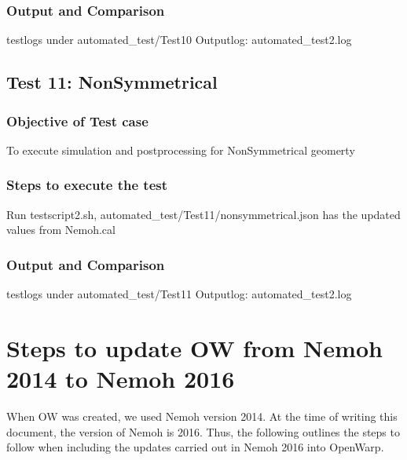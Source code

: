 \documentclass[12pt]{article}
\begin{document}
\subsubsection{Output and Comparison}
testlogs under automated_test/Test10
Outputlog: automated_test2.log

\subsection{Test 11: NonSymmetrical}
\subsubsection{Objective of Test case}
To execute simulation and postprocessing for NonSymmetrical geomerty
\subsubsection{Steps to execute the test}
Run testscript2.sh, automated_test/Test11/nonsymmetrical.json has the updated values from Nemoh.cal 
\subsubsection{Output and Comparison}
testlogs under automated_test/Test11
Outputlog: automated_test2.log


\section{Steps to update OW from Nemoh 2014 to Nemoh 2016}
When OW was created, we used Nemoh version 2014. At the time of writing this document, the version of Nemoh is 2016. Thus, the following outlines the steps to follow when including the updates carried out in Nemoh 2016 into OpenWarp.
\end{document}
